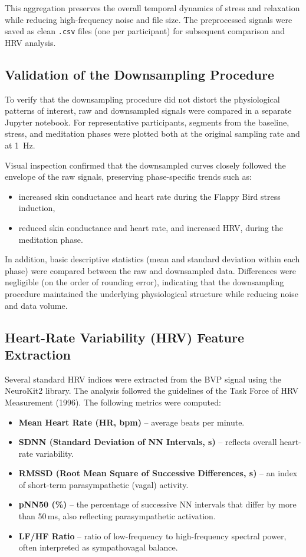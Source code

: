 This aggregation preserves the overall temporal dynamics of stress and
relaxation while reducing high-frequency noise and file size. The preprocessed
signals were saved as clean \texttt{.csv} files (one per participant) for
subsequent comparison and HRV analysis.

\subsection{Validation of the Downsampling Procedure}

To verify that the downsampling procedure did not distort the physiological
patterns of interest, raw and downsampled signals were compared in a separate
Jupyter notebook. For representative participants, segments from the baseline,
stress, and meditation phases were plotted both at the original sampling rate
and at 1~Hz.

Visual inspection confirmed that the downsampled curves closely followed the
envelope of the raw signals, preserving phase-specific trends such as:

\begin{itemize}
  \item increased skin conductance and heart rate during the Flappy Bird stress
        induction,
  \item reduced skin conductance and heart rate, and increased HRV, during the
        meditation phase.
\end{itemize}

In addition, basic descriptive statistics (mean and standard deviation within
each phase) were compared between the raw and downsampled data. Differences
were negligible (on the order of rounding error), indicating that the
downsampling procedure maintained the underlying physiological structure while
reducing noise and data volume.

\subsection{Heart-Rate Variability (HRV) Feature Extraction}
\label{sec:hrv-extraction}
Several standard HRV indices were extracted from the BVP signal using the
NeuroKit2 library. The analysis followed the guidelines of the Task Force of
HRV Measurement (1996)\cite{taskforce1996hrv}. The following metrics were computed:

\begin{itemize}
    \item \textbf{Mean Heart Rate (HR, bpm)} – average beats per minute.
    \item \textbf{SDNN (Standard Deviation of NN Intervals, s)} – reflects overall heart-rate variability.
    \item \textbf{RMSSD (Root Mean Square of Successive Differences, s)} – an index of short-term parasympathetic (vagal) activity.
    \item \textbf{pNN50 (\%)} – the percentage of successive NN intervals that differ by more than 50\,ms, also reflecting parasympathetic activation.
    \item \textbf{LF/HF Ratio} – ratio of low-frequency to high-frequency spectral power, often interpreted as sympathovagal balance.
\end{itemize}

